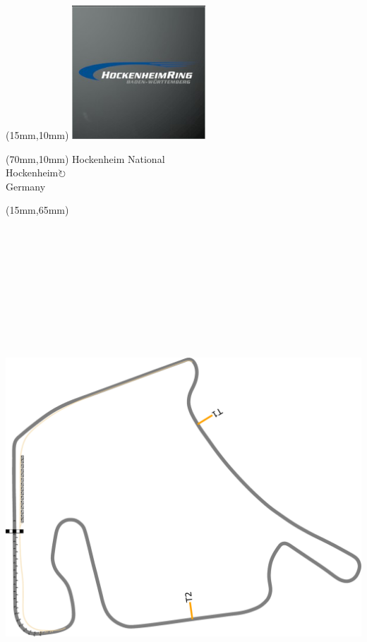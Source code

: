 \null\newpage
\begin{textblock*}{50mm}(15mm,10mm)%
\includegraphics[width=50mm]{LG/2015-05-20_00082.png}
\end{textblock*}
\begin{textblock*}{130mm}(70mm,10mm)%
{\fontsize{20}{20}\selectfont Hockenheim National\\}
{\fontsize{16}{16}\selectfont Hockenheim\hfill \Large$\circlearrowright$\\}
{\fontsize{12}{12}\selectfont Germany\\}
\end{textblock*}
\begin{textblock*}{185mm}(15mm,65mm)%
\centering
\mbox{\includegraphics[width=185mm,height=210mm,keepaspectratio]{PT/HONA.pdf}}
\end{textblock*}
